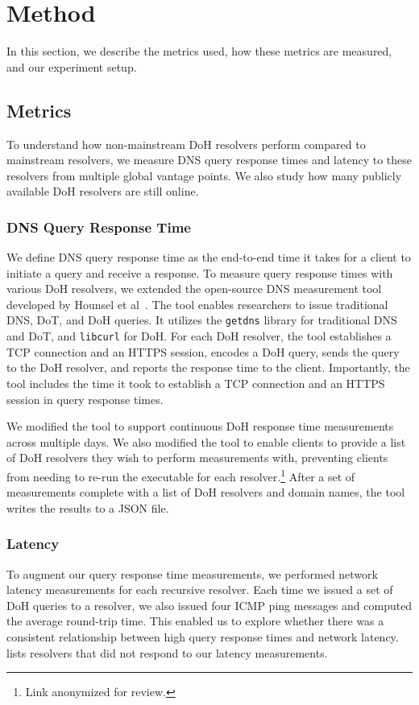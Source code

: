 \section{Method}\label{sec:method}
In this section, we describe the metrics used, how these metrics are measured, and our experiment setup.

\subsection{Metrics}
To understand how non-mainstream DoH resolvers perform compared to mainstream resolvers, we measure DNS query response times and latency to these resolvers from multiple global vantage points.
We also study how many publicly available DoH resolvers are still online.

\subsubsection{DNS Query Response Time}
We define DNS query response time as the end-to-end time it takes for a client to initiate a query and receive a response.
To measure query response times with various DoH resolvers, we extended the open-source DNS measurement tool developed by Hounsel et al~\cite{hounsel2020comparing}.
The tool enables researchers to issue traditional DNS, DoT, and DoH queries.
It utilizes the \texttt{getdns} library for traditional DNS and DoT, and \texttt{libcurl} for DoH.
For each DoH resolver, the tool establishes a TCP connection and an HTTPS session, encodes a DoH query, sends the query to the DoH resolver, and reports the response time to the client.
Importantly, the tool includes the time it took to establish a TCP connection and an HTTPS session in query response times.

We modified the tool to support continuous DoH response time measurements across multiple days.
We also modified the tool to enable clients to provide a list of DoH resolvers they wish to perform measurements with, preventing clients from needing to re-run the executable for each resolver.\footnote{Link anonymized for review.}
After a set of measurements complete with a list of DoH resolvers and domain names, the tool writes the results to a JSON file.

\subsubsection{Latency}
To augment our query response time measurements, we performed network latency measurements for each recursive resolver.
Each time we issued a set of DoH queries to a resolver, we also issued four ICMP ping messages and computed the average round-trip time.
This enabled us to explore whether there was a consistent relationship between high query response times and network latency.
 lists resolvers that did not respond to our latency measurements.


